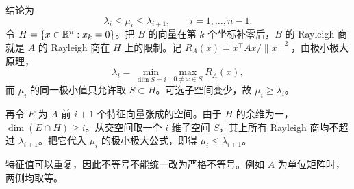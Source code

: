 结论为
\[
 \boxed{\lambda_i\le\mu_i\le\lambda_{i+1}},
 \qquad i=1,\ldots,n-1.
\]
令 $H=\{x\in\mathbb{R}^n:x_k=0\}$。把 $B$ 的向量在第 $k$ 个坐标补零后，$B$ 的 Rayleigh 商就是 $A$ 的 Rayleigh 商在 $H$ 上的限制。记 $R_A(x)=x^\top Ax/\|x\|^2$，由极小极大原理，
\[
 \lambda_i=\min_{\dim S=i}\ \max_{0\ne x\in S}R_A(x),
\]
而 $\mu_i$ 的同一极小值只允许取 $S\subset H$。可选子空间变少，故 $\mu_i\ge\lambda_i$。

再令 $E$ 为 $A$ 前 $i+1$ 个特征向量张成的空间。由于 $H$ 的余维为一，$\dim(E\cap H)\ge i$。从交空间取一个 $i$ 维子空间 $S$，其上所有 Rayleigh 商均不超过 $\lambda_{i+1}$。把它代入 $\mu_i$ 的极小极大公式，即得 $\mu_i\le\lambda_{i+1}$。

特征值可以重复，因此不等号不能统一改为严格不等号。例如 $A$ 为单位矩阵时，两侧均取等。
